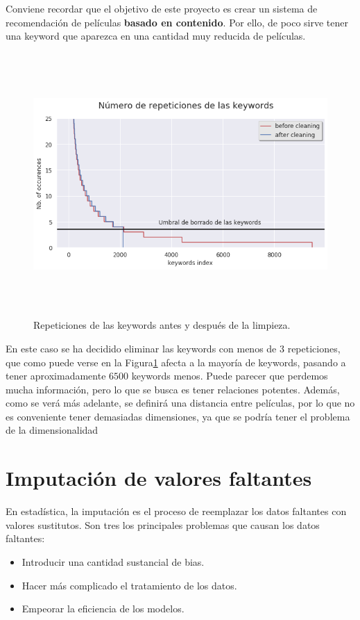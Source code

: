 Conviene recordar que el objetivo de este proyecto es crear un sistema de recomendación de películas \textbf{basado en contenido}. Por ello, de poco sirve tener una keyword que aparezca en una cantidad muy reducida de películas.

\begin{figure}[H]
    \centering
    \captionsetup{width=12cm}
    \includegraphics[height=10cm]{./contenido/imagenes/keyword_cleaning.png}
\caption{Repeticiones de las keywords antes y después de la limpieza.}
\label{fig:key_cleaning}
\end{figure}

En este caso se ha decidido eliminar las keywords con menos de $3$ repeticiones, que como puede verse en la Figura\ref{fig:key_cleaning} afecta a la mayoría de keywords, pasando a tener aproximadamente $6500$ keywords menos. Puede parecer que perdemos mucha información, pero lo que se busca es tener relaciones potentes. Además, como se verá más adelante, se definirá una distancia entre películas, por lo que no es conveniente tener demasiadas dimensiones, ya que se podría tener el problema de la dimensionalidad \cite{wiki:CurseOfDimensionality}

\newpage
\section{Imputación de valores faltantes}

En estadística, la imputación es el proceso de reemplazar los datos faltantes con valores sustitutos. Son tres los principales problemas que causan los datos faltantes:
\begin{itemize}
    \item Introducir una cantidad sustancial de bias.
    \item Hacer más complicado el tratamiento de los datos.
    \item Empeorar la eficiencia de los modelos.
\end{itemize}

